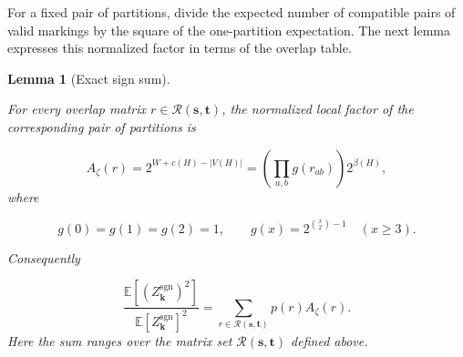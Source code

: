 \documentclass[a4paper,10pt,reqno]{amsart}
\numberwithin{equation}{section}
\newcommand{\Exp}[1]{\mathbb{E}\!\left[#1\right]}
\theoremstyle{plain}
\newtheorem{lemma}[theorem]{Lemma}
\theoremstyle{remark}
\begin{document}
For a fixed pair of partitions, divide the expected number of compatible
pairs of valid markings by the square of the one-partition expectation.
The next lemma expresses this normalized factor in terms of the overlap
table.

\begin{lemma}[Exact sign sum]
\label{lemma-6.1-exact-sign-sum}

For every overlap matrix $r\in\mathcal R(\mathbf s,\mathbf t)$, the normalized
local factor of the corresponding pair of partitions is

\[
 A_\zeta(r)=2^{W+c(H)-|V(H)|}
 =\left(\prod_{a,b}g(r_{ab})\right)2^{\beta(H)},          \tag{6.4}
\]
where

\[
 g(0)=g(1)=g(2)=1,\qquad
 g(x)=2^{\binom x2-1}\quad(x\ge3).                       \tag{6.5}
\]

Consequently

\[
 \frac{\Exp{(Z_{\mathbf k}^{\mathrm{sgn}})^2}}
      {\Exp{Z_{\mathbf k}^{\mathrm{sgn}}}^2}
 =\sum_{r\in\mathcal R(\mathbf s,\mathbf t)}
      p(r)A_\zeta(r).                                    \tag{6.6}
\]
Here the sum ranges over the matrix set $\mathcal R(\mathbf s,\mathbf t)$
defined above.

\end{lemma}
\end{document}
